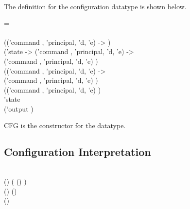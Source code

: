 \documentclass[../../main/main.tex]{subfiles}
\begin{document}
The definition for the configuration datatype is shown below.

\begin{tabbing}
\parskip=8pt
 = \\
\hspace{0.3cm}     \\
\hspace{0.5cm}  (('command , 'principal, 'd, 'e)  -> )\\
\hspace{0.5cm}    ('state -> ('command , 'principal, 'd, 'e)   -> \\
\hspace{0.5cm}    ('command , 'principal, 'd, 'e)  ) \\
 \hspace{0.5cm}   (('command , 'principal, 'd, 'e)   -> \\
\hspace{0.5cm}    ('command , 'principal, 'd, 'e)  ) \\
 \hspace{0.5cm}  (('command , 'principal, 'd, 'e)   ) \\
\hspace{0.5cm}   'state \\
\hspace{0.5cm} ('output )
\parskip=18pt
\end{tabbing}

CFG is the constructor for the datatype.

\subsection{Configuration Interpretation}

\begin{tabbing}
\parskip=8pt
\HOLTokenTurnstile{} \\
\hspace{0.5cm}(\HOLSymConst{,}\HOLSymConst{,})
     (    (\HOLSymConst{::}) 
        ) \HOLSymConst{\HOLTokenEquiv{}} \\
\hspace{0.5cm}(\HOLSymConst{,}\HOLSymConst{,})    \HOLSymConst{\HOLTokenConj{}} (\HOLSymConst{,}\HOLSymConst{,})   \HOLSymConst{\HOLTokenConj{}}\\
\hspace{0.5cm}(\HOLSymConst{,}\HOLSymConst{,})    
\parskip=18pt
\end{tabbing}
\end{document}
